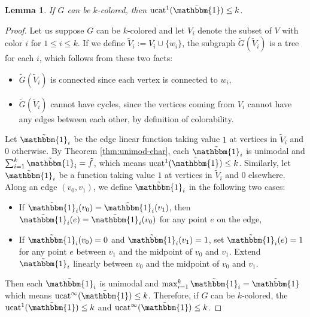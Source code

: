 \documentclass[11pt]{article}
\DeclareMathOperator{\ucat}{ucat}
\newtheorem{lem}[thm]{Lemma}
\begin{document}
\begin{lem}
\label{l:p1}
If $G$ can be $k$-colored, then $\ucat^1(\tilde{\mathbbm{1}}) \leq k$. 
\end{lem}
\begin{proof}
Let us suppose $G$ can be $k$-colored and let $V_i$ denote the subset of $V$ with color $i$ for $1 \leq i \leq k$. If we define $\tilde{V}_i := V_i \cup \{w_i\}$, the subgraph $\tilde{G}(\tilde{V}_i)$ is a tree for each $i$, which follows from these two facts:
\begin{itemize}
	\item $\tilde{G}(\tilde{V}_i)$ is connected since each vertex is connected to $w_i$,
	\item $\tilde{G}(\tilde{V}_i)$ cannot have cycles, since the vertices coming from $V_i$ cannot have any edges between each other, by definition of colorability. 
\end{itemize}
Let $\tilde{\mathbbm{1}}_i$ be the edge linear function taking value $1$ at vertices in $\tilde{V}_i$ and $0$ otherwise. By Theorem \ref{thm:unimod-char}, each $\tilde{\mathbbm{1}}_i$ is unimodal and $\sum_{i=1}^{k} \tilde{\mathbbm{1}}_i = \tilde{f}$, which means $\ucat^1(\tilde{\mathbbm{1}}) \leq k$. Similarly, let
$\tilde{\mathbbm{1}}_i$ be a function taking value $1$ at vertices in $\tilde{V}_i$ and $0$ elsewhere. Along an edge $(v_0, v_1)$, we define $\tilde{\mathbbm{1}}_i$ in the following two cases:
\begin{itemize}
\item If $\tilde{\mathbbm{1}}_i(v_0) = \tilde{\mathbbm{1}}_i(v_1)$, then $\tilde{\mathbbm{1}}_i(e) = \tilde{\mathbbm{1}}_i(v_0)$ for any point $e$ on the edge,
\item If $\tilde{\mathbbm{1}}_i(v_0) = 0$ and $\tilde{\mathbbm{1}}_i(v_1) = 1$, set $\tilde{\mathbbm{1}}_i(e) = 1$ for any point $e$ between $v_1$ and the midpoint of $v_0$ and $v_1$. Extend $\tilde{\mathbbm{1}}_i$ linearly between $v_0$ and the midpoint of $v_0$ and $v_1$.
\end{itemize}
Then each $\tilde{\mathbbm{1}}_i$ is unimodal and $\max_{i=1}^{k} \tilde{\mathbbm{1}}_i = \tilde{\mathbbm{1}}$ which means $\ucat^{\infty}(\tilde{\mathbbm{1}}) \leq k$. Therefore, if $G$ can be $k$-colored, the $\ucat^1(\tilde{\mathbbm{1}}) \leq k$ and $\ucat^{\infty}(\tilde{\mathbbm{1}}) \leq k$.
\end{proof}
\end{document}
